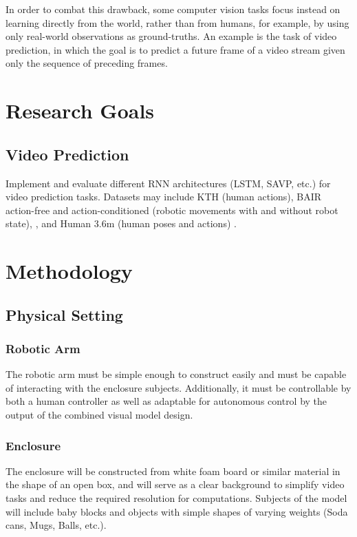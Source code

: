 \documentclass[10pt, letterpaper]{article}
\begin{document}
In order to combat this drawback, some computer vision tasks focus instead on
learning directly from the world, rather than from humans, for example, by
using only real-world observations as ground-truths. An example is the task of
video prediction, in which the goal is to predict a future frame of a video
stream given only the sequence of preceding frames.
\cite{video_prediction_survey}

\section{Research Goals}

\subsection{Video Prediction}

Implement and evaluate different RNN architectures (LSTM, SAVP, etc.) for video
prediction tasks. Datasets may include KTH \cite{kth} (human actions), BAIR
action-free and action-conditioned (robotic movements with and without robot
state), \cite{savp}, and Human 3.6m (human poses and actions) \cite{humans3_6}.

\section{Methodology}

\subsection{Physical Setting}

\subsubsection{Robotic Arm} The robotic arm must
be simple enough to construct easily and must be capable of interacting with
the enclosure subjects. Additionally, it must be controllable by both a human
controller as well as adaptable for autonomous control by the output of the
combined visual model design. \subsubsection{Enclosure} The enclosure will be
constructed from white foam board or similar material in the shape of an open
box, and will serve as a clear background to simplify video tasks and reduce
the required resolution for computations. Subjects of the model will include
baby blocks and objects with simple shapes of varying weights (Soda cans, Mugs,
Balls, etc.).
\end{document}

